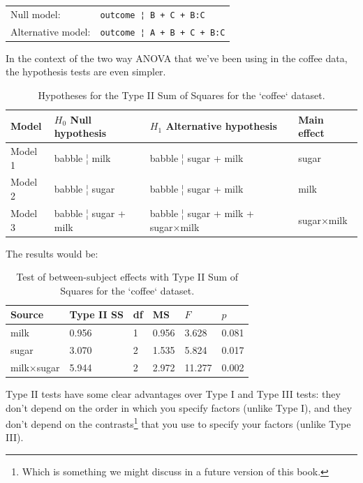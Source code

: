 \documentclass[
]{book}
\theoremstyle{definition}
\theoremstyle{definition}
\theoremstyle{definition}
\theoremstyle{definition}
\theoremstyle{remark}
\begin{document}
\begin{longtable}[]{@{}ll@{}}
\toprule()
\endhead
Null model: & \texttt{outcome\ ¦\ B\ +\ C\ +\ B:C} \\
Alternative model: & \texttt{outcome\ ¦\ A\ +\ B\ +\ C\ +\ B:C} \\
\bottomrule()
\end{longtable}

In the context of the two way ANOVA that we've been using in the coffee data, the hypothesis tests are even simpler.

\begin{table}[!h]

\caption{\label{tab:unnamed-chunk-101}Hypotheses for the Type II Sum of Squares for the `coffee` dataset.}
\centering
\begin{tabular}[t]{llll}
\toprule
Model & $H_0$ Null hypothesis & $H_1$ Alternative hypothesis & Main effect\\
\midrule
Model 1 & babble ¦ milk & babble ¦ sugar + milk & sugar\\
Model 2 & babble ¦ sugar & babble ¦ sugar + milk & milk\\
Model 3 & babble ¦ sugar + milk & babble ¦ sugar + milk + sugar×milk & sugar×milk\\
\bottomrule
\end{tabular}
\end{table}

The results would be:

\begin{table}[!h]

\caption{\label{tab:unnamed-chunk-102}Test of between-subject effects with Type II Sum of Squares for the `coffee` dataset.}
\centering
\begin{tabular}[t]{llllll}
\toprule
Source & Type II SS & df & MS & $F$ & $p$\\
\midrule
milk & 0.956 & 1 & 0.956 & 3.628 & 0.081\\
sugar & 3.070 & 2 & 1.535 & 5.824 & 0.017\\
milk×sugar & 5.944 & 2 & 2.972 & 11.277 & 0.002\\
\bottomrule
\end{tabular}
\end{table}

Type II tests have some clear advantages over Type I and Type III tests: they don't depend on the order in which you specify factors (unlike Type I), and they don't depend on the contrasts\footnote{Which is something we might discuss in a future version of this book.} that you use to specify your factors (unlike Type III).
\end{document}
